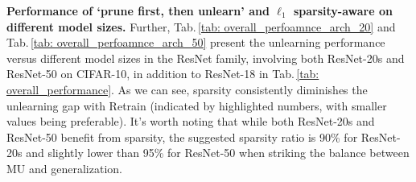\noindent \textbf{Performance of `prune first, then unlearn’ and $\ell_1$ sparsity-aware {\MU} on different model sizes.}
Further, Tab.\,\ref{tab: overall_perfoamnce_arch_20} and Tab.\,\ref{tab: overall_perfoamnce_arch_50} present the unlearning performance versus different model sizes in the ResNet family, involving both ResNet-20s and ResNet-50 on CIFAR-10, in addition to ResNet-18 in Tab.\,\ref{tab: overall_performance}. As we can see, sparsity consistently diminishes the unlearning gap with Retrain (indicated by highlighted numbers, with smaller values being preferable). It's worth noting that while both ResNet-20s and ResNet-50 benefit from sparsity, the suggested sparsity ratio is 90\% for ResNet-20s and slightly lower than 95\% for ResNet-50 when striking the balance between MU and generalization. 

\begin{table}[htb]
\centering

\caption{\footnotesize{MU performance on (\textbf{ResNet-20s}, CIFAR-10) using   `prune first, then unlearn'  (applying to the OMP-resulted 90\% sparse model)  and `sparse-aware unlearning' (applying to the original dense model). The   performance is reported in the form $a_{\pm b}$, with mean $a$ and standard deviation $b$ computed over $10$ independent trials.  
A performance gap  against \textcolor{blue}{{\retrain}} is provided 
in (\textcolor{blue}{$\bullet$}).Smaller performance gap from Retrain is better in the context of machine unlearning.
} }
\vspace*{-1mm}
\label{tab: overall_perfoamnce_arch_20}
\end{table}
